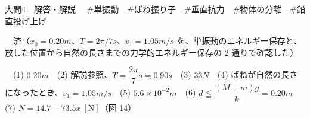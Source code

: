 \documentclass[paper=b5, fontsize=8pt, fleqn, twoside]{jlreq}
\begin{document}
\begin{ascolorbox4A}[75点・30分]{大問4　解答・解説}
　\#単振動　\#ばね振り子　\#垂直抗力　\#物体の分離　\#鉛直投げ上げ\par
{}　済（$x_0=0.20\unit{m}$、$T=2\pi/7\unit{s}$、$v_1=1.05\unit{m/s}$ を、単振動のエネルギー保存と、放した位置から自然の長さまでの力学的エネルギー保存の 2 通りで確認した）\par
{}　(1) $0.20\unit{m}$　(2) 解説参照、$T=\dfrac{2\pi}{7}\unit{s}\fallingdotseq0.90\unit{s}$　(3) $33\unit{N}$　(4) ばねが自然の長さになったとき、$v_1=1.05\unit{m/s}$　(5) $5.6\times10^{-2}\unit{m}$　(6) $d\leqq\dfrac{(M+m)g}{k}=0.20\unit{m}$　(7) $N=14.7-73.5x\ [\mathrm{N}]$（図 14）
\end{ascolorbox4A}
\end{document}
